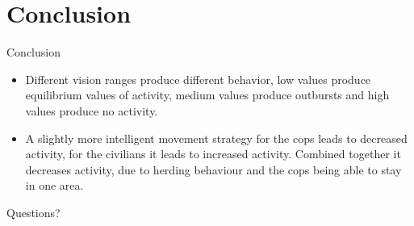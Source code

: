 \documentclass[red]{beamer}
\begin{document}
\section{Conclusion}
\begin{frame}{Conclusion}
  \begin{itemize}
  \item
    Different vision ranges produce different behavior, low values produce equilibrium values of activity, medium values produce outbursts and high values produce no activity.
  \item
    A slightly more intelligent movement strategy for the cops leads to decreased activity, for the civilians it leads to increased activity. Combined together it decreases activity, due to herding behaviour and the cops being able to stay in one area.
  \end{itemize}

  \vspace{15pt}
  \begin{center}
  \huge{Questions?}
  \end{center}
\end{frame}
\end{document}
